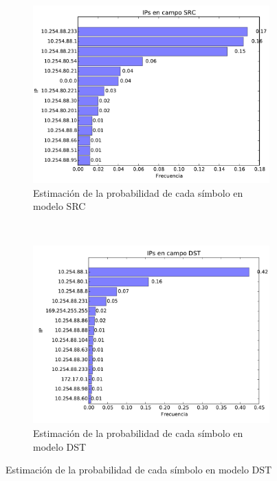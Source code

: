 \begin{figure}[H]
	\center
	\begin{subfigure}{0.4\textwidth}
		\includegraphics[width=1.0\textwidth]{resultados/starbucks/ipsSrc_4_6187931499.pdf}
		\caption{Estimaci\'on de la probabilidad de cada s\'imbolo en modelo SRC}
	\end{subfigure}
	~
	\begin{subfigure}{0.4\textwidth}
		\includegraphics[width=1.0\textwidth]{resultados/starbucks/ipsDst_3_76848714287.pdf}
		\caption{Estimaci\'on de la probabilidad de cada s\'imbolo en modelo DST}
	\end{subfigure}
\end{figure}


